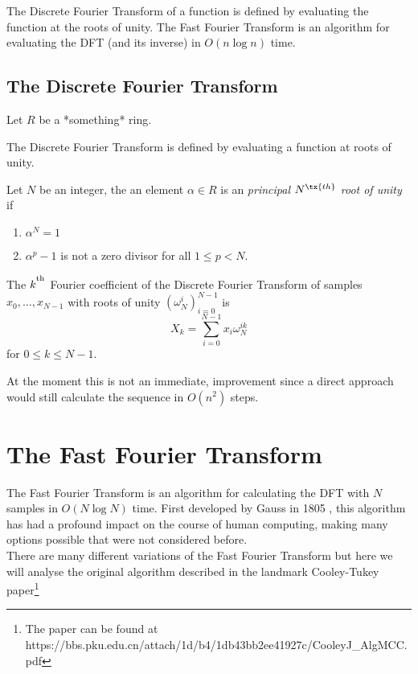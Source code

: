 The Discrete Fourier Transform of a function is defined by evaluating the function at the roots of unity. The Fast Fourier Transform is an algorithm for evaluating the DFT (and its inverse) in $O(n \log n)$ time.

\subsection{The Discrete Fourier Transform}

Let $R$ be a *something* ring.

The Discrete Fourier Transform is defined by evaluating a function at roots of unity.

\begin{definition}
  Let $N$ be an integer, the an element $\alpha \in R$ is an \emph{principal $N^{\tx{th}}$ root of unity} if
  \begin{enumerate}
    \item $\alpha^N = 1$
    \item $\alpha^p - 1$ is not a zero divisor for all $1 \leq p < N$.
  \end{enumerate}
\end{definition}


\begin{definition}
The $k^{\textsuperscript{\textup{th}}}$ Fourier coefficient of the Discrete Fourier Transform of samples $x_0, \ldots, x_{N-1}$ with roots of unity $(\omega_N^i)_{i=0}^{N-1}$ is 
\[
    X_k = \sum^{N-1}_{i=0}x_i\omega_{N}^{ik}
\]
for $0 \leq k \leq N-1$.
\end{definition}

At the moment this is not an immediate, improvement since a direct approach would still calculate the sequence in $O(n^2)$ steps.


\section{The Fast Fourier Transform}

The Fast Fourier Transform is an algorithm for calculating the DFT with $N$ samples in $O(N \log N)$ time. First developed by Gauss in 1805 \cite{gauss}, this algorithm has had a profound impact on the course of human computing, making many options possible that were not considered before.\\
There are many different variations of the Fast Fourier Transform but here we will analyse the original algorithm described in the landmark Cooley-Tukey paper\footnote{The paper can be found at https://bbs.pku.edu.cn/attach/1d/b4/1db43bb2ee41927c/CooleyJ\_AlgMCC.pdf}\\


